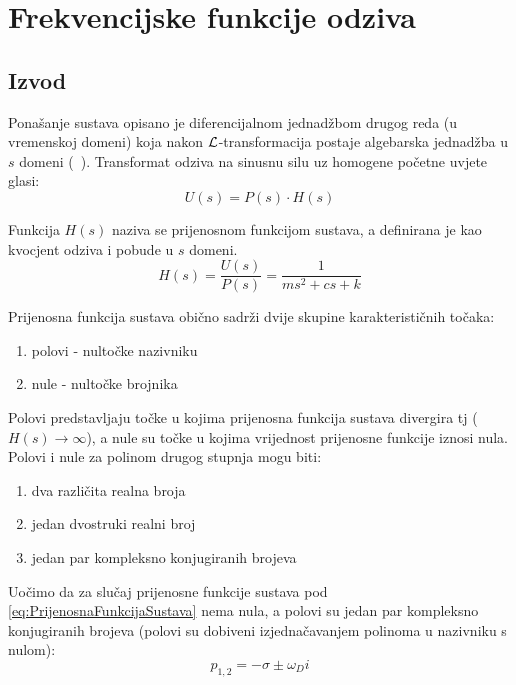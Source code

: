 \section{Frekvencijske funkcije odziva}\label{sec:frf}
\subsection{Izvod}
Ponašanje sustava opisano je diferencijalnom jednadžbom drugog reda (u vremenskoj
domeni) koja nakon $\mathcal{L}$-transformacija postaje algebarska jednadžba u $s$ domeni (~\cite{sisbabic}).
Transformat odziva na sinusnu silu uz homogene početne uvjete glasi:
\begin{equation}
    U(s) = P(s)\cdot H(s) 
\end{equation}

Funkcija $H(s)$ naziva se prijenosnom funkcijom sustava, a definirana je kao
kvocjent odziva i pobude u $s$ domeni.
\begin{equation} \label{eq:PrijenosnaFunkcijaSustava}
    H(s)=\frac{U(s)}{P(s)} = \frac{1}{ms^2+cs+k}%
\end{equation}

Prijenosna funkcija sustava obično sadrži dvije skupine karakterističnih točaka:
\begin{enumerate}
    \item polovi - nultočke nazivniku
    \item nule - nultočke brojnika
\end{enumerate}

Polovi predstavljaju točke u kojima prijenosna funkcija sustava divergira tj
($H(s)\to\infty$), a nule su točke u kojima vrijednost prijenosne funkcije iznosi
nula. Polovi i nule za polinom drugog stupnja mogu biti:
\begin{enumerate}
    \item dva različita realna broja
    \item jedan dvostruki realni broj
    \item jedan par kompleksno konjugiranih brojeva
\end{enumerate}

Uočimo da za slučaj prijenosne funkcije sustava pod
\eqref{eq:PrijenosnaFunkcijaSustava} nema nula, a polovi su jedan par kompleksno
konjugiranih brojeva (polovi su dobiveni izjednačavanjem polinoma u nazivniku s
nulom):
\begin{equation}
    p_{1,2} = -\sigma\pm\omega_Di
\end{equation}

